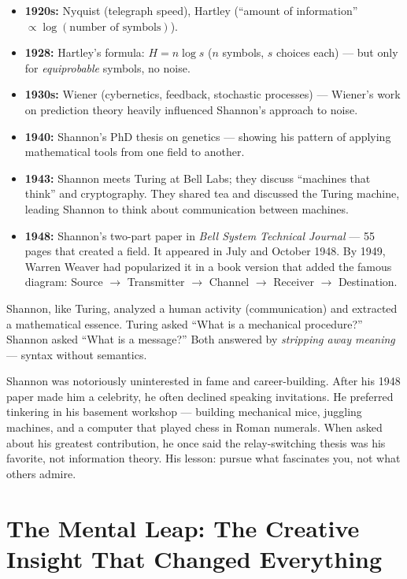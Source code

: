 \begin{itemize}
\item \textbf{1920s:} Nyquist (telegraph speed), Hartley (``amount of information'' $\propto \log(\text{number of symbols})$).
\item \textbf{1928:} Hartley's formula: $H = n \log s$ ($n$ symbols, $s$ choices each) — but only for \emph{equiprobable} symbols, no noise.
\item \textbf{1930s:} Wiener (cybernetics, feedback, stochastic processes) — Wiener's work on prediction theory heavily influenced Shannon's approach to noise.
\item \textbf{1940:} Shannon's PhD thesis on genetics — showing his pattern of applying mathematical tools from one field to another.
\item \textbf{1943:} Shannon meets Turing at Bell Labs; they discuss ``machines that think'' and cryptography. They shared tea and discussed the Turing machine, leading Shannon to think about communication between machines.
\item \textbf{1948:} Shannon's two-part paper in \emph{Bell System Technical Journal} — 55 pages that created a field. It appeared in July and October 1948. By 1949, Warren Weaver had popularized it in a book version that added the famous diagram: Source $\to$ Transmitter $\to$ Channel $\to$ Receiver $\to$ Destination.
\end{itemize}

Shannon, like Turing, analyzed a human activity (communication) and extracted a mathematical essence. Turing asked ``What is a mechanical procedure?'' Shannon asked ``What is a message?'' Both answered by \emph{stripping away meaning} — syntax without semantics.

Shannon was notoriously uninterested in fame and career-building. After his 1948 paper made him a celebrity, he often declined speaking invitations. He preferred tinkering in his basement workshop — building mechanical mice, juggling machines, and a computer that played chess in Roman numerals. When asked about his greatest contribution, he once said the relay-switching thesis was his favorite, not information theory. His lesson: pursue what fascinates you, not what others admire.

\section{The Mental Leap: The Creative Insight That Changed Everything}
\label{sec:information:leap}

